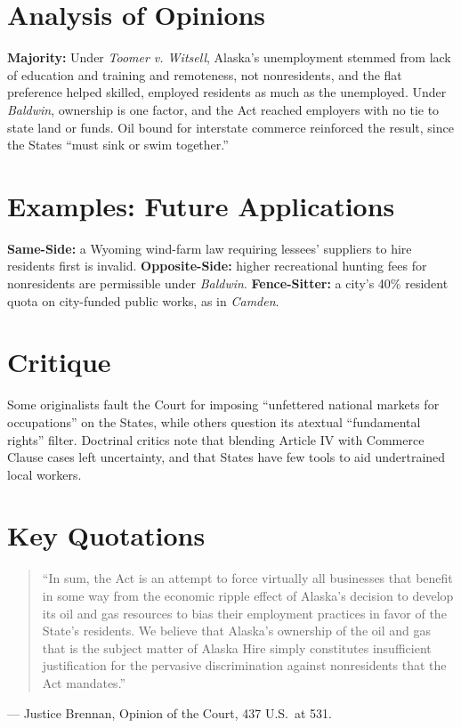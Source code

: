 \documentclass[12pt]{article}
\begin{document}
\section{Analysis of Opinions}
\textbf{Majority:} Under \textit{Toomer v. Witsell}, Alaska's unemployment stemmed from lack of education and training and remoteness, not nonresidents, and the flat preference helped skilled, employed residents as much as the unemployed. Under \textit{Baldwin}, ownership is one factor, and the Act reached employers with no tie to state land or funds. Oil bound for interstate commerce reinforced the result, since the States ``must sink or swim together.''

\section{Examples: Future Applications}
\textbf{Same-Side:} a Wyoming wind-farm law requiring lessees' suppliers to hire residents first is invalid. \textbf{Opposite-Side:} higher recreational hunting fees for nonresidents are permissible under \textit{Baldwin}. \textbf{Fence-Sitter:} a city's 40\% resident quota on city-funded public works, as in \textit{Camden}.

\section{Critique}
Some originalists fault the Court for imposing ``unfettered national markets for occupations'' on the States, while others question its atextual ``fundamental rights'' filter. Doctrinal critics note that blending Article IV with Commerce Clause cases left uncertainty, and that States have few tools to aid undertrained local workers.

\section{Key Quotations}
\begin{quote}
``In sum, the Act is an attempt to force virtually all businesses that benefit in some way from the economic ripple effect of Alaska's decision to develop its oil and gas resources to bias their employment practices in favor of the State's residents. We believe that Alaska's ownership of the oil and gas that is the subject matter of Alaska Hire simply constitutes insufficient justification for the pervasive discrimination against nonresidents that the Act mandates.''
\end{quote}
\noindent --- Justice Brennan, Opinion of the Court, 437 U.S.\ at 531.
\end{document}
